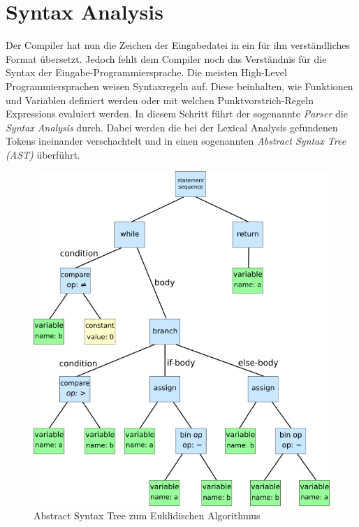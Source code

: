 \section{Syntax Analysis}
Der Compiler hat nun die Zeichen der Eingabedatei in ein für ihn verständliches Format übersetzt.
Jedoch fehlt dem Compiler noch das Verständnis für die Syntax der Eingabe-Programmiersprache.
Die meisten High-Level Programmiersprachen weisen Syntaxregeln auf. Diese beinhalten, wie Funktionen und Variablen definiert werden oder mit welchen Punktvorstrich-Regeln Expressions evaluiert werden.
In diesem Schritt führt der sogenannte \textit{Parser} die \textit{Syntax Analysis} durch.
Dabei werden die bei der Lexical Analysis gefundenen Tokens ineinander verschachtelt und in einen sogenannten \textit{Abstract Syntax Tree (AST)} überführt.

\begin{figure}[H]
    \centering
    \includegraphics[scale=0.3]{resources/images/syntaxtree.svg.png}
    \caption[Abstract Syntax Tree (https://en.wikipedia.org/wiki/Abstract\_syntax\_tree, besucht am 5.8.2024)]{Abstract Syntax Tree zum Euklidischen Algorithmus}
    \label{fig:syntax-tree}
\end{figure}

